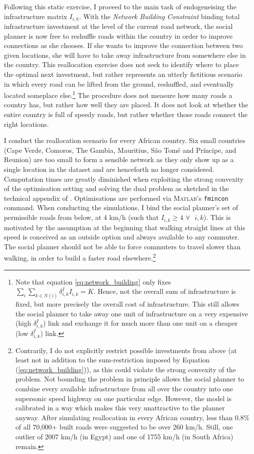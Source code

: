 \documentclass[11pt, oneside]{article}   	%
\let\oldref\ref
\renewcommand{\ref}[1]{(\oldref{#1})}
\begin{document}
Following this static exercise, I proceed to the main task of endogeneising the infrastructure matrix $I_{i,k}$. With the \emph{Network Building Constraint} binding total infrastructure investment at the level of the current road network, the social planner is now free to reshuffle roads within the country in order to improve connections as she chooses. If she wants to improve the connection between two given locations, she will have to take away infrastructure from somewhere else in the country. This reallocation exercise does not seek to identify where to place the optimal next investment, but rather represents an utterly fictitious scenario in which every road can be lifted from the ground, reshuffled, and eventually located someplace else.\footnote{Note that equation \eqref{eq:network_building} only fixes $\sum_{i}^{}\sum_{k \in N(i)}^{} \delta_{i,k}^{I}I_{i,k} = K$. Hence, not the overall sum of infrastructure is fixed, but more precisely the overall cost of infrastructure. This still allows the social planner to take away one unit of infrastructure on a very expensive (high $\delta_{i,k}^{I}$) link and exchange it for much more than one unit on a cheaper (low $\delta_{i,k}^{I}$) link.} The procedure does not measure how many roads a country has, but rather how well they are placed. It does not look at whether the entire country is full of speedy roads, but rather whether those roads connect the right locations.

I conduct the reallocation scenario for every African country. Six small countries (Cape Verde, Comoros, The Gambia, Mauritius, São Tomé and Príncipe, and Reunion) are too small to form a sensible network as they only show up as a single location in the dataset and are henceforth no longer considered. Computation times are greatly diminished when exploiting the strong convexity of the optimisation setting and solving the dual problem as sketched in the technical appendix of \cite{fajgelbaum_optimal_2017}. Optimisations are performed via \textsc{Matlab}'s \texttt{fmincon} command. When conducting the simulations, I bind the social planner's set of permissible roads from below, at 4 km/h (such that $I_{i,k} \geq 4$ $ \forall \textrm{ } i,k$). This is motivated by the assumption at the beginning that walking straight lines at this speed is conceived as an outside option and always available to any commuter. The social planner should not be able to force commuters to travel slower than walking, in order to build a faster road elsewhere.\footnote{Contrarily, I do not explicitly restrict possible investments from above (at least not in addition to the sum-restriction imposed by Equation \ref{eq:network_building}), as this could violate the strong convexity of the problem. Not bounding the problem in principle allows the social planner to combine every available infrastructure from all over the country into one supersonic speed highway on one particular edge. However, the model is calibrated in a way which makes this very unattractive to the planner anyway. After simulating reallocation in every African country, less than 0.8\% of all 70,000+ built roads were suggested to be over 260 km/h. Still, one outlier of 2007 km/h (in Egypt) and one of 1755 km/h (in South Africa) remain.}
\end{document}
